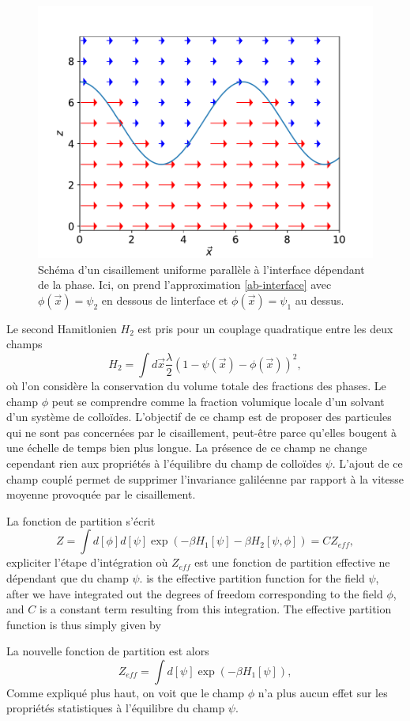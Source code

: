 \begin{figure}
    \centering
    \includegraphics[width=0.5\linewidth]{pop/ab-phi.pdf}
    \caption{Schéma d'un cisaillement uniforme parallèle à l'interface dépendant de la phase. Ici, on prend l'approximation \ref{ab-interface} avec $\phi(\vec{x})=\psi_2$ en dessous de linterface et $\phi(\vec{x})=\psi_1$ au dessus. }
\end{figure}

Le second Hamitlonien $H_2$ est pris pour un couplage quadratique entre les deux champs
\begin{equation}
H_2 =\int d\vec{x} \frac{\lambda}{2}(1-\psi(\vec{x})-\phi(\vec{x}))^2,
\end{equation}
où l'on considère la conservation du volume totale des fractions des phases. Le champ $\phi$ peut se comprendre comme la fraction volumique locale d'un solvant d'un système de colloïdes. L'objectif de ce champ est de proposer des particules qui ne sont pas concernées par le cisaillement, peut-être parce qu'elles bougent à une échelle de temps bien plus longue. La présence de ce champ ne change cependant rien aux propriétés à l'équilibre du champ de colloïdes $\psi$. 
L'ajout de ce champ couplé permet de supprimer l'invariance galiléenne par rapport à la vitesse moyenne provoquée par le cisaillement. 

La fonction de partition s'écrit 
\begin{equation}
Z = \int d[\phi]d[\psi]\exp(-\beta H_1[\psi]- \beta H_2[\psi,\phi]) = CZ_{eff},
\end{equation}
{\color{red} expliciter l'étape d'intégration}
où $Z_{eff}$ est une fonction de partition effective ne dépendant que du champ $\psi$.
is the effective partition function for the field $\psi$, after we have integrated out the degrees of freedom corresponding to the field $\phi$,
and $C$ is a constant term resulting from this integration. The effective partition function is thus simply given by

La nouvelle fonction de partition est alors 
\begin{equation}
    Z_{eff} = \int d[\psi]\exp(-\beta H_1[\psi]),
\end{equation}
Comme expliqué plus haut, on voit que le champ $\phi$ n'a plus aucun effet sur les propriétés statistiques à l'équilibre du champ $\psi$.


